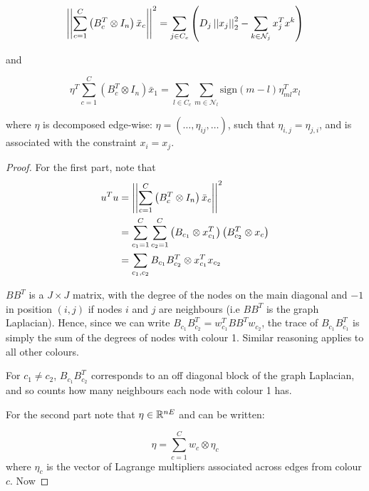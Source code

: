 \documentclass[conference]{IEEEtran}
\begin{document}
\begin{lemma}
\begin{equation}
\left|\left|\sum_{c=1}^C\left(B_c^T \otimes I_n\right)\bar{x}_c\right|\right|^2 = \sum_{j \in C_c}\left( D_j\left|\left|x_j\right|\right|_2^2 - \sum_{k \in \mathcal{N}_j} x_j^Tx^k\right)
\end{equation}

and

\begin{equation}
\eta^T\sum_{c=1}^C\left(B_c^T \otimes I_n\right)\bar{x}_1 = \sum_{l\in C_c} \sum_{m\in \mathcal{N}_l}\mathrm{sign}\left(m-l\right)\eta_{ml}^T x_l
\end{equation}

where \(\eta\) is decomposed edge-wise: \(\eta = \left(\ldots, \eta_{ij},\ldots\right)\), such that \(\eta_{i,j} = \eta_{j,i}\), and is associated with the constraint \(x_i = x_j\).


\begin{proof}
For the first part, note that 
\begin{align*}
u^Tu &= \left|\left|\sum_{c=1}^C\left(B_c^T \otimes I_n\right)\bar{x}_c\right|\right|^2 
\\ &=\sum	_{c_1=1}^C \sum	_{c_2=1}^C  \left(B_{c_1} \otimes x_{c_1}^T\right) \left(B_{c_2}^T \otimes x_c\right) \\
&= \sum_{c_1, c_2} B_{c_1}B_{c_2}^T \otimes x_{c_1}^Tx_{c_2}
\end{align*}

\(BB^T\) is a \(J \times J\) matrix, with the degree of the nodes on the main diagonal and \(-1\) in position \(\left(i,j\right)\) if nodes \(i\) and \(j\) are neighbours (i.e \(BB^T\) is the graph Laplacian). Hence, since we can write \(B_{c_1}B_{c_2}^T = w_{c_1}^TBB^Tw_{c_2}\), the trace of \(B_{c_1}B_{c_1}^T\) is simply the sum of the degrees of nodes with colour 1. Similar reasoning applies to all other colours.

For \(c_1 \neq c_2\),  \(B_{c_1}B_{c_2}^T\) corresponds to an off diagonal block of the graph Laplacian, and so counts how many neighbours each node with colour 1 has.

For the second part note that \(\eta \in {\mathbb{R}}^{nE}\) and can be written:

\begin{equation}
\eta = \sum_{c=1}^C w_c \otimes \eta_c
\end{equation}
where \(\eta_c\) is the vector of Lagrange multipliers associated across edges from colour \(c\). Now


\end{proof}
\end{lemma}
\end{document}

